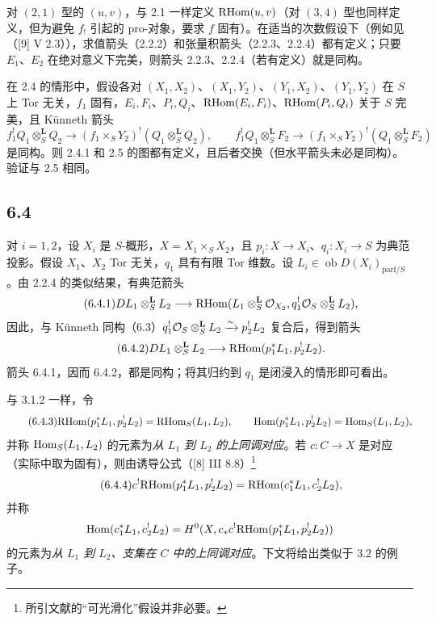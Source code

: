 对 $(2,1)$ 型的 $(u,v)$，与 2.1 一样定义 $\mathrm{RHom}(u,v)$（对 $(3,4)$ 型也同样定义，但为避免 $f_!$ 引起的 pro-对象，要求 $f$ 固有）。在适当的次数假设下（例如见（[9] V 2.3）），求值箭头（2.2.2）和张量积箭头（2.2.3、2.2.4）都有定义；只要 $E_1$、$E_2$ 在绝对意义下完美，则箭头 2.2.3、2.2.4（若有定义）就是同构。

在 2.4 的情形中，假设各对 $(X_1,X_2)$、$(X_1,Y_2)$、$(Y_1,X_2)$、$(Y_1,Y_2)$ 在 $S$ 上 Tor 无关，$f_1$ 固有，$E_i,F_i$、$P_i,Q_i$、$\mathrm{RHom}(E_i,F_i)$、$\mathrm{RHom}(P_i,Q_i)$ 关于 $S$ 完美，且 Künneth 箭头
\[
f_1^!Q_1\otimes_S^{\mathbf L}Q_2\to(f_1\times_SY_2)^!(Q_1\otimes_S^{\mathbf L}Q_2),\qquad
f_1^!Q_1\otimes_S^{\mathbf L}F_2\to(f_1\times_SY_2)^!(Q_1\otimes_S^{\mathbf L}F_2)
\]
是同构。则 2.4.1 和 2.5 的图都有定义，且后者交换（但水平箭头未必是同构）。验证与 2.5 相同。

\subsection*{6.4}
对 $i=1,2$，设 $X_i$ 是 $S$-概形，$X=X_1\times_SX_2$，且 $p_i:X\to X_i$、$q_i:X_i\to S$ 为典范投影。假设 $X_1$、$X_2$ Tor 无关，$q_1$ 具有有限 Tor 维数。设 $L_i\in\operatorname{ob}D(X_i)_{\mathrm{parf}/S}$。由 2.2.4 的类似结果，有典范箭头
\begin{equation}
\tag{6.4.1}
DL_1\otimes_S^{\mathbf L}L_2\longrightarrow \mathrm{RHom}(L_1\otimes_S^{\mathbf L}\mathcal{O}_{X_2},q_1^!\mathcal{O}_S\otimes_S^{\mathbf L}L_2),
\end{equation}
因此，与 Künneth 同构（6.3）$q_1^!\mathcal{O}_S\otimes_S^{\mathbf L}L_2\xrightarrow{\sim}p_2^!L_2$ 复合后，得到箭头
\begin{equation}
\tag{6.4.2}
DL_1\otimes_S^{\mathbf L}L_2\longrightarrow\mathrm{RHom}(p_1^*L_1,p_2^!L_2).
\end{equation}
箭头 6.4.1，因而 6.4.2，都是同构；将其归约到 $q_1$ 是闭浸入的情形即可看出。

与 3.1.2 一样，令
\begin{equation}
\tag{6.4.3}
\mathrm{RHom}(p_1^*L_1,p_2^!L_2)=\mathrm{RHom}_S(L_1,L_2),\qquad
\operatorname{Hom}(p_1^*L_1,p_2^!L_2)=\operatorname{Hom}_S(L_1,L_2),
\end{equation}
并称 $\operatorname{Hom}_S(L_1,L_2)$ 的元素为\emph{从 $L_1$ 到 $L_2$ 的上同调对应}。若 $c:C\to X$ 是对应（实际中取为固有），则由诱导公式（[8] III 8.8）\footnote{所引文献的“可光滑化”假设并非必要。}
\begin{equation}
\tag{6.4.4}
c^!\mathrm{RHom}(p_1^*L_1,p_2^!L_2)=\mathrm{RHom}(c_1^*L_1,c_2^!L_2),
\end{equation}
并称
\[
\operatorname{Hom}(c_1^*L_1,c_2^!L_2)=H^0(X,c_*c^!\mathrm{RHom}(p_1^*L_1,p_2^!L_2))
\]
的元素为\emph{从 $L_1$ 到 $L_2$、支集在 $C$ 中的上同调对应}。下文将给出类似于 3.2 的例子。

